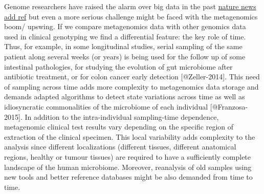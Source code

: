\documentclass{frontiersSCNS} %
\begin{document}
Genome researchers have raised the alarm over big data in the past
\href{http://www.nature.com/news/genome-researchers-raise-alarm-over-big-data-1.17912}{nature
news add ref} but even a more serious challenge might be faced with the
metagenomics boom/ upswing. If we compare metagenomics data with other
genomics data used in clinical genotyping we find a differential
feature: the key role of time. Thus, for example, in some longitudinal
studies, serial sampling of the same patient along several weeks (or
years) is being used for the follow up of some intestinal pathologies,
for studying the evolution of gut microbiome after antibiotic treatment,
or for colon cancer early detection {[}@Zeller-2014{]}. This need of
sampling across time adds more complexity to metagenomics data storage
and demands adapted algorithms to detect state variations across time as
well as idiosyncratic commonalities of the microbiome of each individual
{[}@Franzosa-2015{]}. In addition to the intra-individual sampling-time
dependence, metagenomic clinical test results vary depending on the
specific region of extraction of the clinical specimen. This local
variability adds complexity to the analysis since different
localizations (different tissues, different anatomical regions, healthy
or tumour tissues) are required to have a sufficiently complete
landscape of the human microbiome. Moreover, reanalysis of old samples
using new tools and better reference databases might be also demanded
from time to time.
\end{document}
